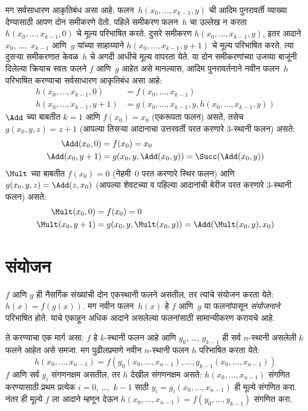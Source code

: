मग सर्वसाधारण आकृतिबंध असा आहे: फलन~$h(x_0, \dots, x_{k-1}, y)$ ची
आदिम पुनरावर्ती व्याख्या देण्यासाठी आपण दोन समीकरणे देतो. पहिले समीकरण
फलन~$h$ चा उल्लेख न करता $h(x_0, \dots, x_{k-1}, 0)$ चे मूल्य
परिभाषित करते. दुसरे समीकरण $h(x_0, \dots, x_{k-1}, y)$, इतर आदाने
$x_0$, \dots,~$x_{k-1}$ आणि~$y$ यांच्या साहाय्याने $h(x_0,
\dots, x_{k-1}, y+1)$ चे मूल्य परिभाषित करते. त्या दुसऱ्या समीकरणात
केवळ~$h$ चे अगदी आधीचे मूल्य वापरता येते. या दोन समीकरणांच्या उजव्या
बाजूंनी दिलेल्या क्रियाच स्वतः फलने $f$ आणि~$g$ आहेत असे मानल्यास,
आदिम पुनरावर्तनाने नवीन फलन~$h$ परिभाषित करण्याचा सर्वसाधारण आकृतिबंध
असा आहे:
\begin{align*}
  h(x_0, \dots, x_{k-1}, 0) & = f(x_0, \dots, x_{k-1})\\
  h(x_0, \dots, x_{k-1}, y+1) & =
  g(x_0, \dots, x_{k-1}, y, h(x_0, \dots, x_{k-1}, y))
\end{align*}
$\Add$ च्या बाबतीत $k=1$ आणि $f(x_0) = x_0$ (एकरूपता फलन) असते,
तसेच $g(x_0, y, z) = z + 1$ (आपल्या तिसऱ्या आदानाचा उत्तरवर्ती
परत करणारे $3$-स्थानी फलन) असते:
\begin{align*}
  \Add(x_0, 0) & = f(x_0) = x_0\\
  \Add(x_0, y+1) & = g(x_0, y, \Add(x_0, y)) =
  \Succ(\Add(x_0, y))
\end{align*}
$\Mult$ च्या बाबतीत $f(x_0) = 0$ (नेहमी~$0$ परत करणारे स्थिर फलन)
आणि $g(x_0, y, z) = \Add(z,x_0)$ (आपल्या शेवटच्या व पहिल्या आदानांची
बेरीज परत करणारे $3$-स्थानी फलन) असते:
\begin{align*}
  \Mult(x_0,0) & =  f(x_0) = 0 \\
  \Mult(x_0,y+1) & =  g(x_0, y, \Mult(x_0,y)) =
  \Add(\Mult(x_0,y), x_0)
\end{align*}











\section{संयोजन}\label{cmp:rec:com:sec}

$f$ आणि $g$ ही नैसर्गिक संख्यांची दोन एकस्थानी फलने असतील, तर त्यांचे
संयोजन करता येते: $h(x) = f(g(x))$. मग नवीन फलन~$h(x)$ हे $f$ आणि~$g$
या फलनांपासून \emph{संयोजनाने} परिभाषित होते. याचे एकाहून अधिक आदाने
असलेल्या फलनांसाठी सामान्यीकरण करायचे आहे.

ते करण्याचा एक मार्ग असा: $f$ हे $k$-स्थानी फलन आहे आणि $g_0$,
\dots, $g_{k-1}$ ही सर्व $n$-स्थानी असलेली $k$ फलने आहेत असे समजा.
मग पुढीलप्रमाणे नवीन $n$-स्थानी फलन $h$ परिभाषित करता येते:
\[h(x_0, \dots, x_{n-1}) =
f(g_0(x_0, \dots, x_{n-1}), \dots, g_{k-1}(x_0, \dots, x_{n-1}))
\]
$f$ आणि सर्व $g_i$ संगणनक्षम असतील, तर $h$ देखील संगणनक्षम असते:
$h(x_0, \dots, x_{n-1})$ संगणित करण्यासाठी प्रथम प्रत्येक $i = 0$,
\dots,~$k-1$ साठी $y_i = g_i(x_0, \dots, x_{n-1})$ ही मूल्ये संगणित
करा. नंतर ही मूल्ये $f$ ला आदाने म्हणून देऊन
$h(x_0, \dots, x_{n-1}) = f(y_0, \dots, y_{k-1})$ संगणित करा.

